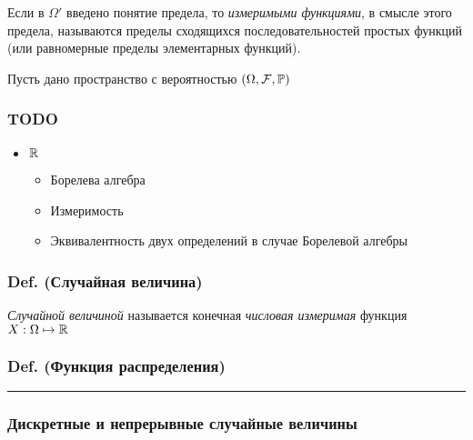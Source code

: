 Если в \(\Omega\prime\) введено понятие предела, то \emph{измеримыми
функциями}, в смысле этого предела, называются пределы сходящихся
последовательностей простых функций (или равномерные пределы
элементарных функций).

Пусть дано пространство с вероятностью \((\Omega, \mathcal F, \mathbb P)\)

\subsubsection{TODO}\label{todo}

\begin{itemize}

\item
  \(\mathbb R\)

  \begin{itemize}
  
  \item
    Борелева алгебра
  \item
    Измеримость
  \item
    Эквивалентность двух определений в случае Борелевой алгебры
  \end{itemize}
\end{itemize}

\subsubsection{Def. (Случайная
величина)}\label{def.-ux441ux43bux443ux447ux430ux439ux43dux430ux44f-ux432ux435ux43bux438ux447ux438ux43dux430}

\emph{Случайной величиной} называется конечная \emph{числовая измеримая}
функция \(X : \Omega\mapsto\mathbb R\)

\subsubsection{Def. (Функция
распределения)}\label{def.-ux444ux443ux43dux43aux446ux438ux44f-ux440ux430ux441ux43fux440ux435ux434ux435ux43bux435ux43dux438ux44f}

\begin{center}\rule{0.5\linewidth}{\linethickness}\end{center}

\subsubsection{Дискретные и непрерывные случайные
величины}\label{ux434ux438ux441ux43aux440ux435ux442ux43dux44bux435-ux438-ux43dux435ux43fux440ux435ux440ux44bux432ux43dux44bux435-ux441ux43bux443ux447ux430ux439ux43dux44bux435-ux432ux435ux43bux438ux447ux438ux43dux44b}

